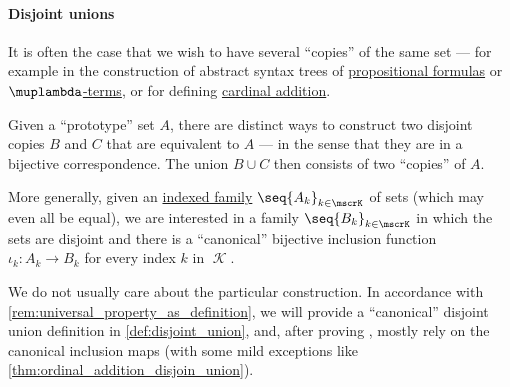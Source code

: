\paragraph{Disjoint unions}

\begin{remark}\label{rem:disjoint_unions}
  It is often the case that we wish to have several \enquote{copies} of the same set --- for example in the construction of abstract syntax trees of \hyperref[def:propositional_formula_ast]{propositional formulas} or \hyperref[def:lambda_term_ast]{\( \muplambda \)-terms}, or for defining \hyperref[def:cardinal_addition]{cardinal addition}.

  Given a \enquote{prototype} set \( A \), there are distinct ways to construct two disjoint copies \( B \) and \( C \) that are equivalent to \( A \) --- in the sense that they are in a bijective correspondence. The union \( B \cup C \) then consists of two \enquote{copies} of \( A \).

  More generally, given an \hyperref[def:indexed_family]{indexed family} \( \seq{ A_k }_{k \in \mscrK} \) of sets (which may even all be equal), we are interested in a family \( \seq{ B_k }_{k \in \mscrK} \) in which the sets are disjoint and there is a \enquote{canonical} bijective inclusion function \( \iota_k: A_k \to B_k \) for every index \( k \) in \( \mscrK \).

  We do not usually care about the particular construction. In accordance with \cref{rem:universal_property_as_definition}, we will provide a \enquote{canonical} disjoint union definition in \cref{def:disjoint_union}, and, after proving , mostly rely on the canonical inclusion maps (with some mild exceptions like \cref{thm:ordinal_addition_disjoin_union}).
\end{remark}

